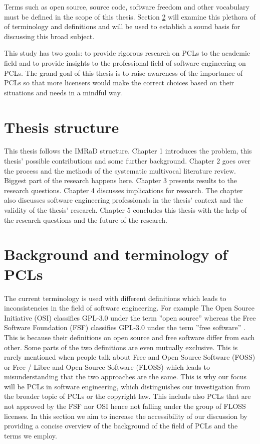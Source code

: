 Terms such as open source, source code, software freedom and other vocabulary must be defined in the scope of this thesis. Section \ref{sec:bg} will examine this plethora of of terminology and definitions and will be used to establish a sound basis for discussing this broad subject.

This study has two goals: to provide rigorous research on PCLs to the academic field and to provide insights to the professional field of software engineering on PCLs. The grand goal of this thesis is to raise awareness of the importance of PCLs so that more licensers would make the correct choices based on their situations and needs in a mindful way.

\section{Thesis structure}
This thesis follows the IMRaD structure. Chapter 1 introduces the problem, this thesis' possible contributions and some further background. Chapter 2 goes over the process and the methods of the systematic multivocal literature review. Biggest part of the research happens here. Chapter 3 presents results to the research questions. Chapter 4 discusses implications for research. The chapter also discusses software engineering professionals in the thesis' context and the validity of the thesis' research. Chapter 5 concludes this thesis with the help of the research questions and the future of the research.

\section{Background and terminology of PCLs}
\label{sec:bg}
The current terminology is used with different definitions which leads to inconsistencies in the field of software engineering. For example The Open Source Initiative (OSI) classifies GPL-3.0 under the term ''open source'' whereas the Free Software Foundation (FSF) classifies GPL-3.0 under the term ''free software'' \citep{osi:gplv3}\citep{rms:opensource}. This is because their definitions on open source and free software differ from each other. Some parts of the two definitions are even mutually exclusive. This is rarely mentioned when people talk about Free and Open Source Software (FOSS) or Free / Libre and Open Source Software (FLOSS) which leads to misunderstanding that the two approaches are the same. This is why our focus will be PCLs in software engineering, which distinguishes our investigation from the broader topic of PCLs or the copyright law. This includs also PCLs that are not approved by the FSF nor OSI hence not falling under the group of FLOSS licenses. In this section we aim to increase the accessibility of our discussion by providing  a concise overview of the background of the field of PCLs and the terms we employ.

